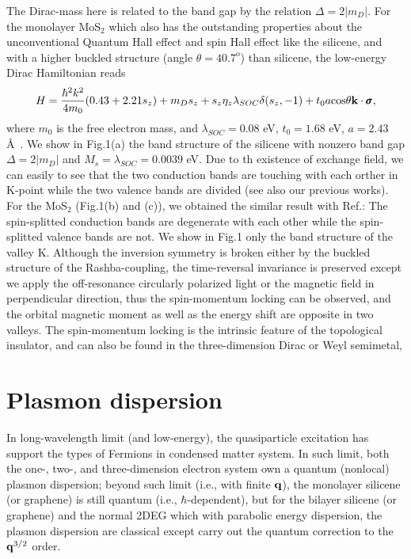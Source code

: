 \documentclass[UTF8,a4paper]{article}
\begin{document}
\begin{large}
The Dirac-mass here is related to the band gap by the relation $\Delta=2|m_{D}|$.
For the monolayer MoS$_{2}$ which also has the outstanding properties about the
unconventional Quantum Hall effect and spin Hall effect like the silicene,
and with a higher buckled structure (angle $\theta=40.7^{\text{o}}$) than silicene,
the low-energy Dirac Hamiltonian reads\cite{Scholz A,Rostami H}
\begin{equation} 
\begin{aligned}
H=\frac{\hbar^{2}k^{2}}{4m_{0}}(0.43+2.21 s_{z})+m_{D}s_{z}+s_{z}\eta_{z}\lambda_{SOC}\delta(s_{z},-1)+t_{0}a{\rm cos}\theta{\bf k}\cdot{\pmb \sigma},
\end{aligned}
\end{equation}
where $m_{0}$ is the free electron mass, and $\lambda_{SOC}=0.08$ eV, $t_{0}=1.68$ eV, $a=2.43$ \AA\ .
We show in Fig.1(a) the band structure of the silicene with nonzero band gap $\Delta=2|m_{D}|$
and $M_{s}=\lambda_{SOC}=0.0039$ eV.
Due to th existence of exchange field, we can easily to see that the two conduction bands are touching with each orther in K-point 
while the two valence bands are divided (see also our previous works\cite{Wu C H3,Wu C H2,Wu C HX}).
For the MoS$_{2}$ (Fig.1(b) and (c)), we obtained the similar result with Ref.\cite{Scholz A}:
The spin-splitted conduction bands are degenerate with each other while the spin-splitted valence bands are not.
We show in Fig.1 only the band structure of the valley K.
Although the inversion symmetry is broken either by the buckled structure of the Rashba-coupling,
the time-reversal invariance is preserved except we apply the off-resonance circularly
polarized light\cite{Wu C HX,Wu C H5,Wu C H2} or the magnetic field in perpendicular direction,
thus the spin-momentum
locking can be observed, and the orbital magnetic moment as well as the energy shift are opposite in two valleys.
The spin-momentum
locking is the intrinsic feature of the topological insulator, and can also be found in the three-dimension Dirac or Weyl semimetal, 


\section{Plasmon dispersion}

In long-wavelength limit (and low-energy), 
the quasiparticle excitation has support the types of Fermions in condensed matter system\cite{Bradlyn B,Lv B Q,Ezawa M2,Wang D}.
In such limit, both the one-\cite{Sarma S D}, two-, and three-dimension electron system own a quantum (nonlocal) plasmon dispersion;
beyond such limit (i.e., with finite ${\bf q}$), the monolayer silicene (or graphene) is still quantum (i.e., $\hbar$-dependent),
but for the bilayer silicene (or graphene) and the normal 2DEG which with parabolic energy dispersion,
the plasmon dispersion are classical except carry out the quantum correction to the ${\bf q}^{3/2}$ order.


\end{large}
\end{document}
